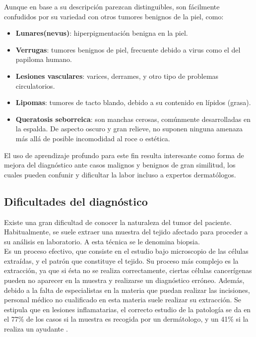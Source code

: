 Aunque en base a su descripción parezcan distinguibles, son fácilmente confudidos por su variedad con otros tumores benignos de la piel, como:

\begin{itemize}
	\item \textbf{Lunares(nevus)}: hiperpigmentación benigna en la piel.
	\item \textbf{Verrugas}: tumores benignos de piel, frecuente debido a virus como el del papiloma humano.
	\item \textbf{Lesiones vasculares}: varices, derrames, y otro tipo de problemas circulatorios.
	\item \textbf{Lipomas}: tumores de tacto blando, debido a su contenido en lípidos (grasa).
	\item \textbf{Queratosis seborreica}: son manchas cerosas, comúnmente desarrolladas en la espalda. De aspecto oscuro y gran relieve, no suponen ninguna amenaza más allá de posible incomodidad al roce o estética.
\end{itemize}

El uso de aprendizaje profundo para este fin resulta interesante como forma de mejora del diagnóstico ante casos malignos y benignos de gran similitud, los cuales pueden confunir y dificultar la labor incluso a expertos dermatólogos.

\subsection{Dificultades del diagnóstico}

Existe una gran dificultad de conocer la naturaleza del tumor del paciente. Habitualmente, se suele extraer una muestra del tejido afectado para proceder a su análisis en laboratorio. A esta técnica se le denomina biopsia.\\

Es un proceso efectivo, que consiste en el estudio bajo microscopio de las células extraídas, y el patrón que constituye el tejido. Su proceso más complejo es la extracción, ya que si ésta no se realiza correctamente, ciertas células cancerígenas pueden no aparecer en la muestra y realizarse un diagnóstico erróneo. Además, debido a la falta de especialistas en la materia que puedan realizar las incisiones, personal médico no cualificado en esta materia suele realizar su extracción. Se estipula que en lesiones inflamatarias, el correcto estudio de la patología se da en el 77\% de los casos si la muestra es recogida por un dermátologo, y un 41\% si la realiza un ayudante \cite{LLAMASVELASCO201212}.

